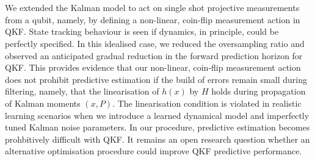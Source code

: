 \\
\\
We extended the Kalman model to act on single shot projective measurements from a qubit, namely, by defining a non-linear, coin-flip measurement action in QKF. State tracking behaviour is seen if dynamics, in principle, could be perfectly specified. In this idealised case, we reduced the oversampling ratio and observed an anticipated gradual reduction in the forward prediction horizon for QKF.  This provides evidence that our non-linear, coin-flip measurement action does not prohibit predictive estimation if the build of errors remain small during filtering, namely, that the linearisation of $h(x)$ by $H$ holds during propagation of Kalman moments $(x, P)$. The linearisation condition is violated in realistic learning scenarios when we introduce a learned dynamical model and imperfectly tuned Kalman noise parameters. In our procedure, predictive estimation becomes prohbitively difficult with QKF. It remains an open research question whether an alternative optimisation procedure could improve QKF predictive performance. 

